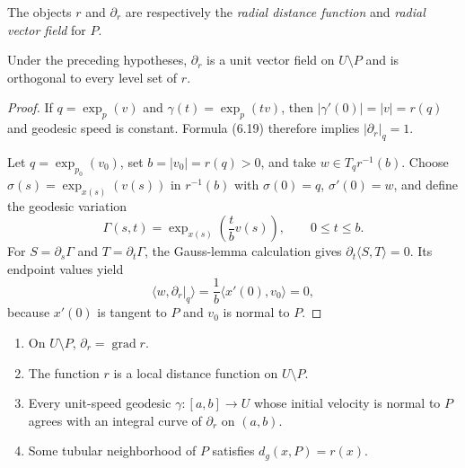 The objects $r$ and $\partial_r$ are respectively the \emph{radial distance
function} and \emph{radial vector field} for $P$.

\begin{theorem}
\label{thm:gauss-lemma-submanifolds}

Under the preceding hypotheses, $\partial_r$ is a unit vector field on
$U\setminus P$ and is orthogonal to every level set of $r$.
\end{theorem}

\begin{proof}
\sketch If $q=\exp_p(v)$ and $\gamma(t)=\exp_p(tv)$, then
$|\gamma'(0)|=|v|=r(q)$ and geodesic speed is constant. Formula (6.19) therefore
implies $|\partial_r|_q=1$.

Let $q=\exp_{p_0}(v_0)$, set $b=|v_0|=r(q)>0$, and take
$w\in T_qr^{-1}(b)$. Choose
$\sigma(s)=\exp_{x(s)}(v(s))$ in $r^{-1}(b)$ with
$\sigma(0)=q$, $\sigma'(0)=w$, and define the geodesic variation
\[
\Gamma(s,t)=\exp_{x(s)}\left(\frac tbv(s)\right),
\qquad 0\leq t\leq b.
\]
For $S=\partial_s\Gamma$ and $T=\partial_t\Gamma$, the Gauss-lemma
calculation gives $\partial_t\langle S,T\rangle=0$. Its endpoint values yield
\[
\langle w,\partial_r|_q\rangle
=\frac1b\langle x'(0),v_0\rangle=0,
\]
because $x'(0)$ is tangent to $P$ and $v_0$ is normal to $P$.
\end{proof}

\begin{corollary}
\label{cor:distance-function-local-properties}

\begin{enumerate}
\item[(a)] On $U\setminus P$, $\partial_r=\operatorname{grad}r$.
\item[(b)] The function $r$ is a local distance function on $U\setminus P$.
\item[(c)] Every unit-speed geodesic $\gamma:[a,b]\to U$ whose initial
velocity is normal to $P$ agrees with an integral curve of $\partial_r$ on
$(a,b)$.
\item[(d)] Some tubular neighborhood of $P$ satisfies
$d_g(x,P)=r(x)$.
\end{enumerate}
\end{corollary}

